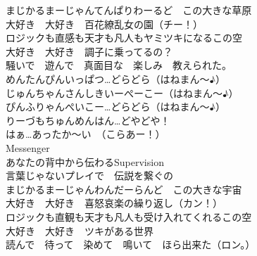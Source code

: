{まじかるまーじゃんてんぱりわーるど　この大きな草原\\
大好き　大好き　百花繚乱女の園（チー！）\\
ロジックも直感も天才も凡人もヤミツキになるこの空\\
大好き　大好き　調子に乗ってるの？\\
騒いで　遊んで　真面目な　楽しみ　教えられた。\\

めんたんぴんいっぱつ…どらどら（はねまん〜♪）\\
じゅんちゃんさんしきいーぺーこー（はねまん〜♪）\\
ぴんふりゃんぺいこー…どらどら（はねまん〜♪）\\
りーづもちゅんめんはん…どやどや！\\
はぁ…あったか〜い　（こらあー！）\\

Messenger\\
あなたの背中から伝わるSupervision\\
言葉じゃないプレイで　伝説を繋ぐの\\

まじかるまーじゃんわんだーらんど　この大きな宇宙\\
大好き　大好き　喜怒哀楽の繰り返し（カン！）\\
ロジックも直観も天才も凡人も受け入れてくれるこの空\\
大好き　大好き　ツキがある世界\\
読んで　待って　染めて　鳴いて　ほら出来た（ロン。）
}

